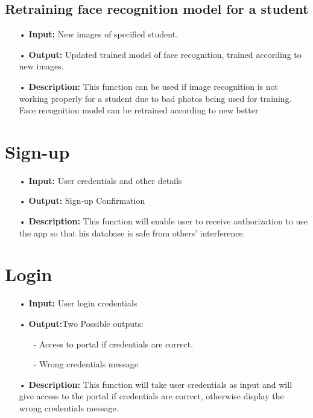 \documentclass{scrreprt}
\begin{document}
\subsection{Retraining face recognition model for a student}
\begin{enumerate}
\item[•]  \textbf{Input:}
New images of specified student.
\item[•]  \textbf{Output:}
Updated trained model of face recognition, trained according to new images.
\item[•]  \textbf{Description:}
This function can be used if image recognition is not working properly for a student due to bad photos being used for training. Face recognition model can be retrained according to new better
\end{enumerate}

\section{Sign-up}
\begin{enumerate}
\item[•]  \textbf{Input:}
User credentials and other details
\item[•]  \textbf{Output:} Sign-up Confirmation
\item[•]  \textbf{Description:}
This function will enable user to receive authorization to use the app so that his database is safe from others' interference.
\end{enumerate}

\section{Login}
\begin{enumerate}
\item[•]  \textbf{Input:}
User login credentials
\item[•]  \textbf{Output:}Two Possible outputs:
\begin{enumerate}
\item [-] Access to portal if credentials are correct.
\item [-] Wrong credentials message
\end{enumerate}
\item[•]  \textbf{Description:}
This function will take user credentials as input and will give access to the portal if credentials are correct, otherwise display the wrong credentials message. 
\end{enumerate}
\end{document}
